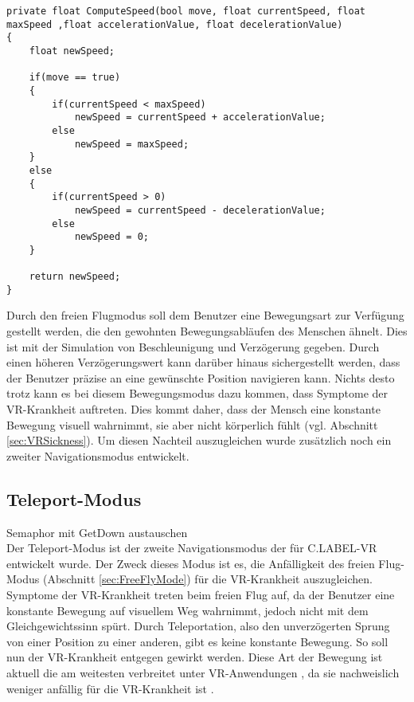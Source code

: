 \begin{lstlisting}[caption={Vereinfachte Implementierung des Beschleunigungs- und Verzögerungsprinzip in eine einzelne Richtung}, captionpos=t, label=lst:FreeFly]
private float ComputeSpeed(bool move, float currentSpeed, float maxSpeed ,float accelerationValue, float decelerationValue)
{
	float newSpeed;	
	
	if(move == true)
	{
		if(currentSpeed < maxSpeed)
			newSpeed = currentSpeed + accelerationValue;
		else
			newSpeed = maxSpeed;
	}
	else
	{
		if(currentSpeed > 0)
			newSpeed = currentSpeed - decelerationValue;
		else
			newSpeed = 0;
	}
	
	return newSpeed;
}
\end{lstlisting}
\quad

Durch den freien Flugmodus soll dem Benutzer eine Bewegungsart zur Verfügung gestellt werden, die den gewohnten Bewegungsabläufen des Menschen ähnelt. Dies ist mit der Simulation von Beschleunigung und Verzögerung gegeben. Durch einen höheren Verzögerungswert kann darüber hinaus sichergestellt werden, dass der Benutzer präzise an eine gewünschte Position navigieren kann. Nichts desto trotz kann es bei diesem Bewegungsmodus dazu kommen, dass Symptome der VR-Krankheit auftreten. Dies kommt daher, dass der Mensch eine konstante Bewegung visuell wahrnimmt, sie aber nicht körperlich fühlt (vgl. Abschnitt \ref{sec:VRSickness}). Um diesen Nachteil auszugleichen wurde zusätzlich noch ein zweiter Navigationsmodus entwickelt.
 
\subsection{Teleport-Modus}
\label{sec:TeleportMode}
Semaphor mit GetDown austauschen\\

Der Teleport-Modus ist der zweite Navigationsmodus der für C.LABEL-VR entwickelt wurde. Der Zweck dieses Modus ist es, die Anfälligkeit des freien Flug-Modus (Abschnitt \ref{sec:FreeFlyMode}) für die VR-Krankheit auszugleichen. Symptome der VR-Krankheit treten beim freien Flug auf, da der Benutzer eine konstante Bewegung auf visuellem Weg wahrnimmt, jedoch nicht mit dem Gleichgewichtssinn spürt. Durch Teleportation, also den unverzögerten Sprung von einer Position zu einer anderen, gibt es keine konstante Bewegung. So soll nun der VR-Krankheit entgegen gewirkt werden. Diese Art der Bewegung ist aktuell die am weitesten verbreitet unter VR-Anwendungen \cite{bib:VRLocomotionReview}, da sie nachweislich weniger anfällig für die VR-Krankheit ist \cite{bib:PointTeleport}.\\

